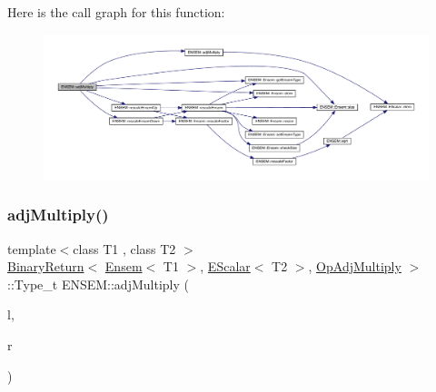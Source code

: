 Here is the call graph for this function\+:\nopagebreak
\begin{figure}[H]
\begin{center}
\leavevmode
\includegraphics[width=350pt]{d1/d9e/group__eensem_ga5f37d8984a1db92adfb04f6c0908a563_cgraph}
\end{center}
\end{figure}
\mbox{\label{group__eensem_ga357579ea9af81c46ec906486ce9f2a52}} 
\subsubsection{\texorpdfstring{adjMultiply()}{adjMultiply()}\hspace{0.1cm}{\footnotesize\ttfamily [2/3]}}
{\footnotesize\ttfamily template$<$class T1 , class T2 $>$ \\
\mbox{\hyperlink{structENSEM_1_1BinaryReturn}{Binary\+Return}}$<$ \mbox{\hyperlink{classENSEM_1_1Ensem}{Ensem}}$<$ T1 $>$, \mbox{\hyperlink{classENSEM_1_1EScalar}{E\+Scalar}}$<$ T2 $>$, \mbox{\hyperlink{structENSEM_1_1OpAdjMultiply}{Op\+Adj\+Multiply}} $>$\+::Type\+\_\+t E\+N\+S\+E\+M\+::adj\+Multiply (\begin{DoxyParamCaption}\item[{const \mbox{\hyperlink{classENSEM_1_1Ensem}{Ensem}}$<$ T1 $>$ \&}]{l,  }\item[{const \mbox{\hyperlink{classENSEM_1_1EScalar}{E\+Scalar}}$<$ T2 $>$ \&}]{r }\end{DoxyParamCaption})\hspace{0.3cm}{\ttfamily [inline]}}

